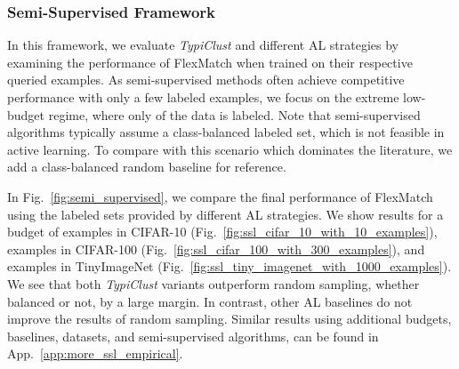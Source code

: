 \documentclass{article}
\newcommand{\app}{App.}
\begin{document}
\subsubsection{Semi-Supervised Framework} 
\label{sec:fwork:(iii)}

In this framework, we evaluate \emph{TypiClust} and different AL strategies by examining the performance of FlexMatch when trained on their respective queried examples.
As semi-supervised methods often achieve competitive performance with only a few labeled examples, we focus on the extreme low-budget regime, where only  of the data is labeled. Note that semi-supervised algorithms typically assume a class-balanced labeled set, which is not feasible in active learning. To compare with this scenario which dominates the literature, we add a class-balanced random baseline for reference.

In Fig.~\ref{fig:semi_supervised}, we compare the final performance of FlexMatch using the labeled sets provided by different AL strategies. We show results for a budget of  examples in CIFAR-10 (Fig.~\ref{fig:ssl_cifar_10_with_10_examples}),  examples in CIFAR-100 (Fig.~\ref{fig:ssl_cifar_100_with_300_examples}), and  examples in TinyImageNet (Fig.~\ref{fig:ssl_tiny_imagenet_with_1000_examples}). We see that both \emph{TypiClust} variants outperform random sampling, whether balanced or not, by a large margin. In contrast, other AL baselines do not improve the results of random sampling. Similar results using additional budgets, baselines, datasets, and semi-supervised algorithms, can be found in \app~\ref{app:more_ssl_empirical}.
\end{document}
